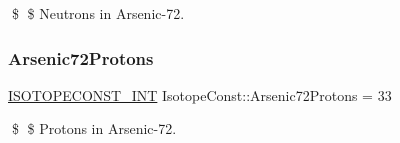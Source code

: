 \$ \$ Neutrons in Arsenic-\/72. \mbox{\label{group___isotope_const-_arsenic-_as72_ga21370b5279c95e8feea06a28816f31e8}} 
\subsubsection{\texorpdfstring{Arsenic72\+Protons}{Arsenic72Protons}}
{\footnotesize\ttfamily \mbox{\hyperlink{group___isotope_const-_macros_ga5f18360b3e99483a35c32d789e62621c}{I\+S\+O\+T\+O\+P\+E\+C\+O\+N\+S\+T\+\_\+\+I\+NT}} Isotope\+Const\+::\+Arsenic72\+Protons = 33}

\$ \$ Protons in Arsenic-\/72. 